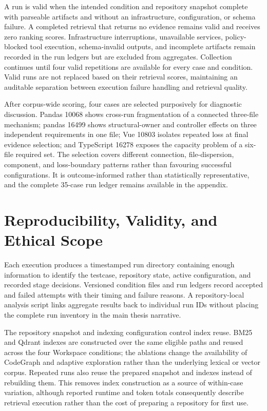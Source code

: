 A run is valid when the intended condition and repository snapshot complete with parseable artifacts and without an infrastructure, configuration, or schema failure. A completed retrieval that returns no evidence remains valid and receives zero ranking scores. Infrastructure interruptions, unavailable services, policy-blocked tool execution, schema-invalid outputs, and incomplete artifacts remain recorded in the run ledgers but are excluded from aggregates. Collection continues until four valid repetitions are available for every case and condition. Valid runs are not replaced based on their retrieval scores, maintaining an auditable separation between execution failure handling and retrieval quality.

After corpus-wide scoring, four cases are selected purposively for diagnostic discussion. Pandas 10068 shows cross-run fragmentation of a connected three-file mechanism; pandas 16499 shows structural-owner and controller effects on three independent requirements in one file; Vue 10803 isolates repeated loss at final evidence selection; and TypeScript 16278 exposes the capacity problem of a six-file required set. The selection covers different connection, file-dispersion, component, and loss-boundary patterns rather than favouring successful configurations. It is outcome-informed rather than statistically representative, and the complete 35-case run ledger remains available in the appendix.

\section{Reproducibility, Validity, and Ethical Scope}\label{sec:reproducibility-validity-and-ethical-scope}

Each execution produces a timestamped run directory containing enough information to identify the testcase, repository state, active configuration, and recorded stage decisions. Versioned condition files and run ledgers record accepted and failed attempts with their timing and failure reasons. A repository-local analysis script links aggregate results back to individual run IDs without placing the complete run inventory in the main thesis narrative.

The repository snapshot and indexing configuration control index reuse. BM25 and Qdrant indexes are constructed over the same eligible paths and reused across the four Workspace conditions; the ablations change the availability of CodeGraph and adaptive exploration rather than the underlying lexical or vector corpus. Repeated runs also reuse the prepared snapshot and indexes instead of rebuilding them. This removes index construction as a source of within-case variation, although reported runtime and token totals consequently describe retrieval execution rather than the cost of preparing a repository for first use.


